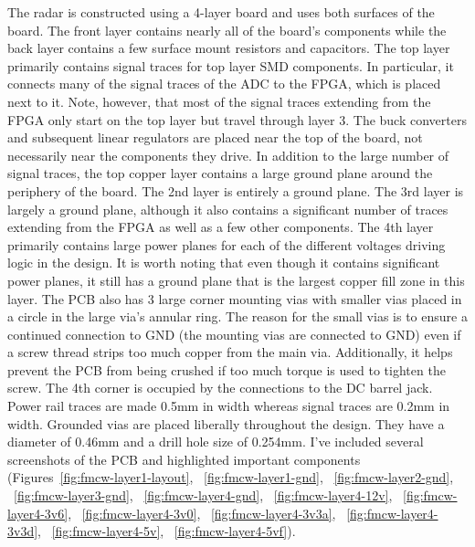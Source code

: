\documentclass{default}
\begin{document}
The radar is constructed using a 4-layer board and uses both surfaces of the board. The front layer contains nearly all
of the board's components while the back layer contains a few surface mount resistors and capacitors. The top layer
primarily contains signal traces for top layer SMD components. In particular, it connects many of the signal traces of
the ADC to the FPGA, which is placed next to it. Note, however, that most of the signal traces extending from the FPGA
only start on the top layer but travel through layer 3. The buck converters and subsequent linear regulators are placed
near the top of the board, not necessarily near the components they drive. In addition to the large number of signal
traces, the top copper layer contains a large ground plane around the periphery of the board. The 2nd layer is entirely
a ground plane. The 3rd layer is largely a ground plane, although it also contains a significant number of traces
extending from the FPGA as well as a few other components. The 4th layer primarily contains large power planes for each
of the different voltages driving logic in the design. It is worth noting that even though it contains significant power
planes, it still has a ground plane that is the largest copper fill zone in this layer. The PCB also has 3 large corner
mounting vias with smaller vias placed in a circle in the large via's annular ring. The reason for the small vias is to
ensure a continued connection to GND (the mounting vias are connected to GND) even if a screw thread strips too much
copper from the main via. Additionally, it helps prevent the PCB from being crushed if too much torque is used to
tighten the screw. The 4th corner is occupied by the connections to the DC barrel jack. Power rail traces are made 0.5mm
in width whereas signal traces are 0.2mm in width. Grounded vias are placed liberally throughout the design. They have a
diameter of 0.46mm and a drill hole size of 0.254mm. I've included several screenshots of the PCB and highlighted
important components (Figures~\ref{fig:fmcw-layer1-layout}, ~\ref{fig:fmcw-layer1-gnd}, ~\ref{fig:fmcw-layer2-gnd},
~\ref{fig:fmcw-layer3-gnd}, ~\ref{fig:fmcw-layer4-gnd}, ~\ref{fig:fmcw-layer4-12v}, ~\ref{fig:fmcw-layer4-3v6},
~\ref{fig:fmcw-layer4-3v0}, ~\ref{fig:fmcw-layer4-3v3a}, ~\ref{fig:fmcw-layer4-3v3d}, ~\ref{fig:fmcw-layer4-5v},
~\ref{fig:fmcw-layer4-5vf}).
\end{document}
